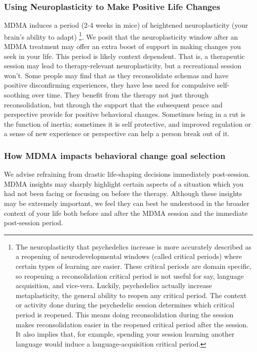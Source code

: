 \documentclass[12pt,letterpaper]{article}
\begin{document}
\subsubsection{Using Neuroplasticity to Make Positive Life Changes}
\label{sec:neuroplasticity}
MDMA induces a period (2-4 weeks in mice) of heightened neuroplasticity (your brain's ability to adapt) \cite{nardouMDMAPlasticity,nardouMDMAPlasticity} \footnote{The neuroplasticity that psychedelics increase is more accurately described as a reopening of neurodevelopmental windows (called critical periods) where certain types of learning are easier. These critical periods are domain specific, so reopening a reconsolidation critical period is not useful for say, language acquisition, and vice-vera. Luckily, psychedelics actually increase metaplasticity, the general ability to reopen any critical period. The context or activity done during the psychedelic session determines which critical period is reopened. This means doing reconsolidation during the session makes reconsolidation easier in the reopened critical period after the session. It also implies that, for example, spending your session learning another language would induce a language-acquisition critical period.}. We posit that the neuroplasticity window after an MDMA treatment may offer an extra boost of support in making changes you seek in your life. This period is likely context dependent. That is, a therapeutic session may lead to therapy-relevant neuroplasticity, but a recreational session won't. Some people may find that as they reconsolidate schemas and have positive disconfirming experiences, they have less need for compulsive self-soothing over time. They benefit from the therapy not just through reconsolidation, but through the support that the subsequent peace and perspective provide for positive behavioral changes. Sometimes being in a rut is the function of inertia; sometimes it is self protective, and improved regulation or a sense of new experience or perspective can help a person break out of it.

\subsubsection*{How MDMA impacts behavioral change goal selection}

We advise refraining from drastic life-shaping decisions immediately post-session. MDMA insights may sharply highlight certain aspects of a situation which you had not been facing or focusing on before the therapy. Although these insights may be extremely important, we feel they can best be understood in the broader context of your life both before and after the MDMA session and the immediate post-session period.
\end{document}
